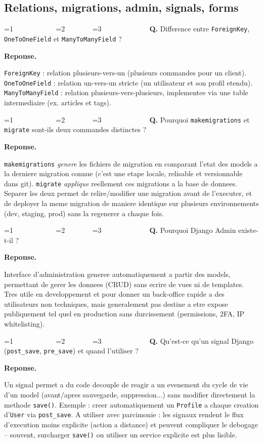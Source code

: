 \documentclass[11pt,a4paper]{article}
\newcommand{\badgeJ}{\textcolor{white}{\colorbox{junior}{\small\bfseries\ JUNIOR\ }}}
\newcommand{\badgeM}{\textcolor{white}{\colorbox{mid}{\small\bfseries\ MID\ }}}
\newcommand{\badgeS}{\textcolor{white}{\colorbox{senior}{\small\bfseries\ SENIOR\ }}}
\newcounter{qcount}
\newenvironment{qa}[2]{%
  \stepcounter{qcount}%
  \par\vspace{6pt}%
  \noindent\colorbox{qbg}{\parbox{\dimexpr\linewidth-12pt}{\vspace{2pt}%
  \ifnum#1=1 \badgeJ\fi\ifnum#1=2 \badgeM\fi\ifnum#1=3 \badgeS\fi
  \ \textbf{Q\theqcount.} #2\vspace{2pt}}}\par\vspace{4pt}%
  \noindent\textbf{\color{accent}Reponse.}\ \ignorespaces
}{%
  \par\vspace{8pt}%
}
\begin{document}
\subsection{Relations, migrations, admin, signals, forms}

\begin{qa}{1}{Difference entre \texttt{ForeignKey}, \texttt{OneToOneField} et \texttt{ManyToManyField} ?}
\texttt{ForeignKey} : relation plusieurs-vers-un (plusieurs commandes pour un
client). \texttt{OneToOneField} : relation un-vers-un stricte (un utilisateur
et son profil etendu). \texttt{ManyToManyField} : relation plusieurs-vers-plusieurs,
implementee via une table intermediaire (ex. articles et tags).
\end{qa}

\begin{qa}{1}{Pourquoi \texttt{makemigrations} et \texttt{migrate} sont-ils deux commandes distinctes ?}
\texttt{makemigrations} \emph{genere} les fichiers de migration en comparant
l'etat des models a la derniere migration connue (c'est une etape locale,
relisable et versionnable dans git). \texttt{migrate} \emph{applique}
reellement ces migrations a la base de donnees. Separer les deux permet de
relire/modifier une migration avant de l'executer, et de deployer la meme
migration de maniere identique sur plusieurs environnements (dev, staging,
prod) sans la regenerer a chaque fois.
\end{qa}

\begin{qa}{1}{Pourquoi Django Admin existe-t-il ?}
Interface d'administration generee automatiquement a partir des models,
permettant de gerer les donnees (CRUD) sans ecrire de vues ni de templates.
Tres utile en developpement et pour donner un back-office rapide a des
utilisateurs non techniques, mais generalement pas destine a etre expose
publiquement tel quel en production sans durcissement (permissions, 2FA, IP
whitelisting).
\end{qa}

\begin{qa}{2}{Qu'est-ce qu'un signal Django (\texttt{post\_save}, \texttt{pre\_save}) et quand l'utiliser ?}
Un signal permet a du code decouple de reagir a un evenement du cycle de vie
d'un model (avant/apres sauvegarde, suppression...) sans modifier directement
la methode \texttt{save()}. Exemple : creer automatiquement un
\texttt{Profile} a chaque creation d'\texttt{User} via \texttt{post\_save}. A
utiliser avec parcimonie : les signaux rendent le flux d'execution moins
explicite (\og{}action a distance\fg{}) et peuvent compliquer le debogage --
souvent, surcharger \texttt{save()} ou utiliser un service explicite est plus
lisible.
\end{qa}
\end{document}
